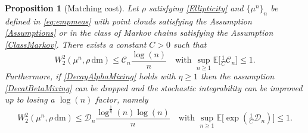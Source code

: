 \documentclass[11pt,a4paper,oneside]{amsart}
\numberwithin{equation}{section}
\newtheorem{proposition}[theorem]{Proposition}
\newcommand{\dd}{\mathrm{d}}
\newcommand{\m}{\mathrm{m}}
\begin{document}
\begin{proposition}[Matching cost]\label{prop:matchcost}
%
Let $\rho$ satisfying \eqref{Ellipticity} and $\{\mu^n\}_n$ be defined in \eqref{eq:empmeas} with point clouds satisfying the Assumption \ref{Assumptions} or in the class of Markov chains satisfying the Assumption \ref{ClassMarkov}. There exists a constant $C>0$ such that 
%
\begin{equation}\label{eq:matchingcost}
%
W_2^2(\mu^n, \rho \,\dd \m) \le \mathcal{C}_n \frac{\log(n)}{n}\quad\text{with $\sup_{n\geq 1}\mathbb{E}\big[\tfrac{1}{C}\mathcal{C}_n\big]\leq 1$.}
%
\end{equation}
%
Furthermore, if \eqref{DecayAlphaMixing} holds with $\eta\geq 1$ then the assumption \eqref{DecatBetaMixing} can be dropped and the stochastic integrability can be improved up to losing a $\log(n)$ factor, namely 
%
\begin{equation}\label{eq:matchingcostHighMoments}
%
W_2^2(\mu^n, \rho \,\dd \m) \le \mathcal{D}_n \frac{\log^{\frac{1}{\eta}}(n)\log(n)}{n}\quad\text{with $\sup_{n\geq 1}\mathbb{E}\big[\exp(\tfrac{1}{C}\mathcal{D}_n)\big]\leq 1$.}
%
\end{equation}
%
\end{proposition}
\end{document}
